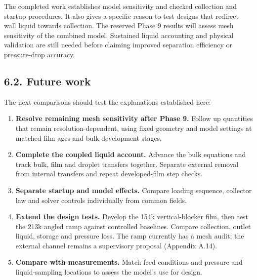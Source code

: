\documentclass[
  12pt,
  a4paper,
]{article}
\providecommand{\tightlist}{%
  \setlength{\itemsep}{0pt}\setlength{\parskip}{0pt}}
\begin{document}
The completed work establishes model sensitivity and checked collection
and startup procedures. It also gives a specific reason to test designs
that redirect wall liquid towards collection. The reserved Phase 9
results will assess mesh sensitivity of the combined model. Sustained
liquid accounting and physical validation are still needed before
claiming improved separation efficiency or pressure-drop accuracy.

\subsection{6.2. Future work}\label{future-work}

The next comparisons should test the explanations established here:

\begin{enumerate}
\def\labelenumi{\arabic{enumi}.}
\tightlist
\item
  \textbf{Resolve remaining mesh sensitivity after Phase 9.} Follow up
  quantities that remain resolution-dependent, using fixed geometry and
  model settings at matched film ages and bulk-development stages.
\item
  \textbf{Complete the coupled liquid account.} Advance the bulk
  equations and track bulk, film and droplet transfers together.
  Separate external removal from internal transfers and repeat
  developed-film step checks.
\item
  \textbf{Separate startup and model effects.} Compare loading sequence,
  collector law and solver controls individually from common fields.
\item
  \textbf{Extend the design tests.} Develop the 154k vertical-blocker
  film, then test the 213k angled ramp against controlled baselines.
  Compare collection, outlet liquid, storage and pressure loss. The ramp
  currently has a mesh audit; the external channel remains a supervisory
  proposal (Appendix A.14).
\item
  \textbf{Compare with measurements.} Match feed conditions and pressure
  and liquid-sampling locations to assess the model's use for design.
\end{enumerate}
\end{document}
